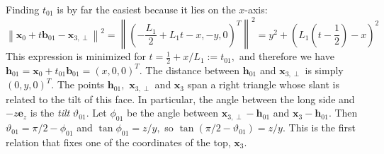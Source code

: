 \documentclass[10pt,a4paper]{article}
\newcommand{\half}[0]{\frac{1}{2}}
\newcommand{\bvec}[1]{\mathbf{#1}}
\begin{document}
Finding $t_{01}$ is by far the easiest because it lies on the $x$-axis:
\begin{equation*}
  \left\| \bvec{x}_0 + t \bvec{b}_{01} - \bvec{x}_{3,\perp}\right\|^2 = \left\| \left(-\frac{L_1}{2} + L_1t - x, -y, 0\right)^T \right\|^2 = y^2 + \left(L_1\left(t-\half\right) - x\right)^2
\end{equation*}
This expression is minimized for $t = \half + x/L_1 := t_{01},$ and therefore we have $\bvec{h}_{01} = \bvec{x}_0 + t_{01}\bvec{b}_{01} = ( x, 0, 0 )^T.$
The distance between $\bvec{h}_{01}$ and $\bvec{x}_{3,\perp}$ is simply $(0,y,0)^T.$
The points $\bvec{h}_{01},$ $\bvec{x}_{3,\perp}$ and $\bvec{x}_3$ span a right triangle whose slant is related to the tilt of this face.
In particular, the angle between the long side and $-z \bvec{e}_z$ is the \emph{tilt} $\vartheta_{01}.$
Let $\phi_{01}$ be the angle between $\bvec{x}_{3,\perp} - \bvec{h}_{01}$ and $\bvec{x}_3 - \bvec{h}_{01}.$
Then $\vartheta_{01} = \pi/2 - \phi_{01}$ and $\tan \phi_{01} = z/y,$ so $\tan (\pi/2 - \vartheta_{01}) = z/y.$
This is the first relation that fixes one of the coordinates of the top, $\bvec{x}_3.$
\end{document}
